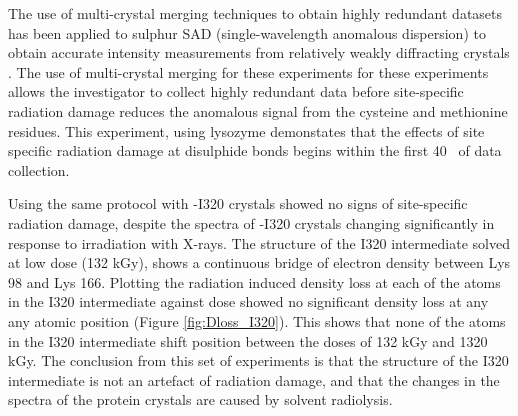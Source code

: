 The use of multi-crystal merging techniques to obtain highly redundant datasets has been applied to sulphur SAD (single-wavelength anomalous dispersion) to obtain accurate intensity measurements from relatively weakly diffracting crystals \cite{ElOmari2014}. The use of multi-crystal merging for these experiments for these experiments allows the investigator to collect highly redundant data before site-specific radiation damage reduces the anomalous signal from the cysteine and methionine residues. This experiment, using lysozyme demonstates that the effects of site specific radiation damage at disulphide bonds begins within the first 40 \kgy ~of data collection.
   

Using the same protocol with \atpdx -I320 crystals showed no signs of site-specific radiation damage, despite the spectra of \atpdx -I320 crystals changing significantly in response to irradiation with X-rays. The structure of the I320 intermediate solved at low dose (132 kGy), shows a continuous bridge of electron density between Lys 98 and Lys 166. Plotting the radiation induced density loss at each of the atoms in the I320 intermediate against dose showed no significant density loss at any any atomic position (Figure \ref{fig:Dloss_I320}). This shows that none of the atoms in the I320 intermediate shift position between the doses of 132 kGy and 1320 kGy. The conclusion from this set of experiments is that the structure of the I320 intermediate is not an artefact of radiation damage, and that the changes in the spectra of the protein crystals are caused by solvent radiolysis.       





